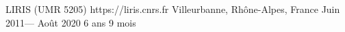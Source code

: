\jobcompany%
{LIRIS (UMR 5205)}%
{https://liris.cnrs.fr}%
{Villeurbanne, Rhône-Alpes, France}%
{Juin 2011--- Août 2020}%
{6 ans 9 mois}
{}
